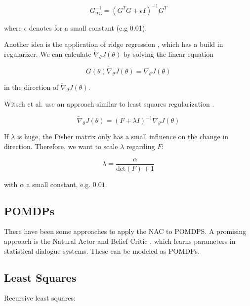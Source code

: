 	\begin{equation}
		G^{-1}_{\text{reg}} = \left( G^T G + \epsilon I \right)^{-1} G^T
	\end{equation}
	
	\noindent where $\epsilon$ denotes for a small constant (e.g 0.01).
	
	Another idea is the application of ridge regression \cite{hoerl1970ridge}, which has a build in regularizer. We can calculate $\widetilde{\nabla}_{\theta} J(\theta)$ by solving the linear equation
	
	\begin{equation}
		G(\theta) \widetilde{\nabla}_{\theta} J(\theta) = \nabla_{\theta} J(\theta)
	\end{equation}
	
	\noindent in the direction of $\widetilde{\nabla}_{\theta} J(\theta)$.
	
	Witsch et al. use an approach similar to least squares regularization \cite{witsch2011enhancing}. 
	
	\begin{equation}
		\widetilde{\nabla}_{\theta} J(\theta) = \left( F + \lambda I \right)^{-1} \nabla_\theta J(\theta)
	\end{equation}
	
	\noindent If $\lambda$ is huge, the Fisher matrix only has a small influence on the change in direction. Therefore, we want to scale $\lambda$ regarding $F$:
	
	\begin{equation}
		\lambda = \dfrac{\alpha}{\text{det}(F) + 1}
	\end{equation}

	\noindent with $\alpha$ a small constant, e.g. $0.01$.
	
	
	\subsection{POMDPs}
	There have been some approaches to apply the NAC to POMDPS. A promising approach is the Natural Actor and Belief Critic \cite{jurvcivcek2011natural}, which learns parameters in statistical dialogue systems. These can be modeled as POMDPs.
	
	\subsection{Least Squares}
	
	Recursive least squares: \cite{park2005rls}
	
